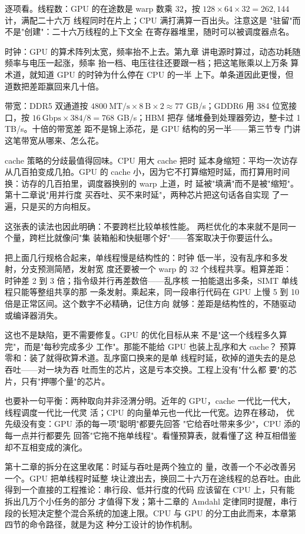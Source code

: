 逐项看。线程数：GPU 的在途数是 warp 数乘 32，按
$128\times64\times32=262,144$ 计，满配二十六万
线程同时在片上；CPU 满打满算一百出头。注意这是
"驻留"而不是"创建"：二十六万线程的上下文全
在寄存器堆里，随时可以被调度器点名。

时钟：GPU 的算术阵列太宽，频率抬不上去。第九章
讲电源时算过，动态功耗随频率与电压一起涨，频率
抬一档、电压往往还要跟一档；把这笔账乘以上万条
算术道，就知道 GPU 的时钟为什么停在 CPU 的一半
上下。单条道因此更慢，但道数把差距赢回来几十倍。

带宽：DDR5 双通道按
$4800\ \text{MT/s}\times8\ \text{B}\times2\approx77$
GB/s；GDDR6 用 384 位宽接口，按
$16\ \text{Gbps}\times384/8=768$ GB/s；HBM 把存
储堆叠到处理器旁边，整卡过 1 TB/s。十倍的带宽差
距不是锦上添花，是 GPU 结构的另一半——第三节专
门讲这笔带宽从哪来、怎么花。

cache 策略的分歧最值得回味。CPU 用大 cache 把时
延本身缩短：平均一次访存从几百拍变成几拍。GPU
的 cache 小，因为它不打算缩短时延，而打算用时间
换：访存的几百拍里，调度器换别的 warp 上道，时
延被"填满"而不是被"缩短"。第十二章说"用并行度
买吞吐、买不来时延"，两种芯片把这句话各自实现
了一遍，只是买的方向相反。

这张表的读法也因此明确：不要跨栏比较单核性能。
两栏优化的本来就不是同一个量，跨栏比就像问"集
装箱船和快艇哪个好"——答案取决于你要运什么。

把上面几行规格合起来，单线程慢是结构性的：时钟
低一半，没有乱序和多发射，分支预测简陋，发射宽
度还要被一个 warp 的 32 个线程共享。粗算差距：
时钟差 2 到 3 倍；指令级并行再差数倍——乱序核
一拍能退出多条，SIMT 单线程只能等整组共享的那
一条发射。乘起来，同一段串行代码在 GPU 上慢 5
到 10 倍是正常区间。这个数字不必精确，记住方向
就够：差距是结构性的，不随驱动或编译器消失。

这也不是缺陷，更不需要修复。GPU 的优化目标从来
不是"这一个线程多久算完"，而是"每秒完成多少
工作"。那能不能给 GPU 也装上乱序和大 cache？
预算零和：装了就得砍算术道。乱序窗口换来的是单
线程时延，砍掉的道失去的是总吞吐——对一块为吞
吐而生的芯片，这是亏本交换。工程上没有"什么都
要"的芯片，只有"押哪个量"的芯片。

也要补一句平衡：两种取向并非泾渭分明。近年的
GPU，cache 一代比一代大，线程调度一代比一代灵
活；CPU 的向量单元也一代比一代宽。边界在移动，
优先级没有变：GPU 添的每一项"聪明"都要先回答
"它给吞吐带来多少"，CPU 添的每一点并行都要先
回答"它拖不拖单线程"。看懂预算表，就看懂了这
种互相借鉴却不互相变成的演化。

第十二章的拆分在这里收尾：时延与吞吐是两个独立的
量，改善一个不必改善另一个。GPU 把单线程时延整
块让渡出去，换回二十六万在途线程的总吞吐。由此
得到一个直接的工程推论：串行段、低并行度的代码
应该留在 CPU 上，只有能拆出几万个小任务的部分
才值得下发；第十二章的 Amdahl 定律同时提醒，串行
段的长短决定整个混合系统的加速上限。CPU 与 GPU
的分工由此而来，本章第四节的命令路径，就是为这
种分工设计的协作机制。

